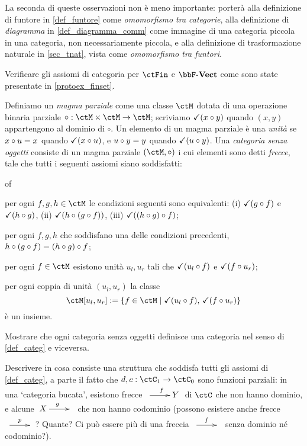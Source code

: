La seconda di queste osservazioni non è meno importante: porterà alla definizione di funtore in \ref{def_funtore} come \emph{omomorfismo tra categorie}, alla definizione di \emph{diagramma} in \ref{def_diagramma_comm} come immagine di una categoria piccola in una categoria, non necessariamente piccola, e alla definizione di trasformazione naturale in \ref{sec_tnat}, vista come \emph{omomorfismo tra funtori}.
\begin{esercizi}
	\item \label{jgdasoh_4} Verificare gli assiomi di categoria per \(\ctFin\) e \(\ctVect\) come sono state presentate in \ref{protoex_finset}.
	\item \label{jgdasoh_1} Definiamo un \emph{magma parziale} come una classe \(\ctM\) dotata di una operazione binaria parziale \(\cmp : \ctM\times\ctM\to\ctM\); scriviamo \(\checkmark(x\circ y)\) quando \((x,y)\) appartengono al dominio di \(\circ\). Un elemento di un magma parziale è una \emph{unità} se \(x\circ u = x\) quando \(\checkmark(x\circ u)\), e \(u\circ y = y\) quando \(\checkmark(u\circ y)\). Una \emph{categoria senza oggetti} consiste di un magma parziale \((\ctM,\cmp)\) i cui elementi sono detti \emph{frecce}, tale che tutti i seguenti assiomi siano soddisfatti:
	\begin{enumtag}{of}
		\item per ogni \(f,g,h\in\ctM\) le condizioni seguenti sono equivalenti: (i) \(\checkmark(g\circ f)\) e \(\checkmark(h\circ g)\), (ii) \(\checkmark(h\circ (g\circ f))\), (iii) \(\checkmark((h\circ g)\circ f)\);
		\item per ogni \(f,g,h\) che soddisfano una delle condizioni precedenti, \(h\circ (g\circ f) = (h\circ g)\circ f\);
		\item per ogni \(f\in\ctM\) esistono unità \(u_l,u_r\) tali che \(\checkmark(u_l\circ f)\) e \(\checkmark(f\circ u_r)\);
		\item per ogni coppia di unità \((u_l,u_r)\) la classe
		\[\ctM[u_l,u_r] := \{f\in\ctM\mid \checkmark(u_l\cmp f),\,\checkmark(f\cmp u_r)\}\]
		è un insieme.
	\end{enumtag}
	Mostrare che ogni categoria senza oggetti definisce una categoria nel senso di \ref{def_categ} e viceversa.
	\item \label{jgdasoh_2} Descrivere in cosa consiste una struttura che soddisfa tutti gli assiomi di \ref{def_categ}, a parte il fatto che \(d,c : \ctC_1\to\ctC_0\) sono funzioni parziali: in una `categoria bucata', esistono frecce \(\xymatrix{{} \ar[r]^f & Y}\) di \(\ctC\) che non hanno dominio, e alcune \(\xymatrix{X \ar[r]^g & {}}\) che non hanno codominio (possono esistere anche frecce \(\xymatrix{{} \ar[r]^p & {}}\)? Quante? Ci può essere più di una freccia \(\xymatrix{{} \ar[r]^f & {}}\) senza dominio né codominio?).

\end{esercizi}
